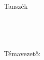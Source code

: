 \begin{titlepage}
    \begin{center}
        \vspace*{\fill}
        \large \textbf{\myuni}\\
        \large \mykar\\
        \large \mytanszek Tanszék\\
        \large \myszak \\
        \vspace{2cm}
        \Huge \textbf{\mydolgozat}\\
        \vspace{2cm}
        \Large \textbf{\mycim}\\
        \vspace{2cm}
        \Large \textbf{\mynev}\\
        \vspace{2cm}
        \large Témavezető: \mytemavezeto\\
        \vspace{1cm}
        \vspace{1cm}
        \large \myev
        \vspace*{\fill}
    \end{center}
\end{titlepage} 